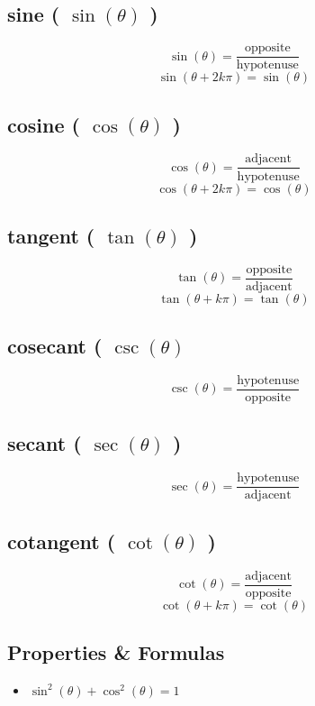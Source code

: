 \subsection{sine ( $\sin(\theta)$ )}\label{sin}

\[
    \sin(\theta) = \displaystyle \frac{\mathrm{opposite}}{\mathrm{hypotenuse}}
\]
\[    \sin(\theta + 2k\pi) = \sin(\theta)   \]

\subsection{cosine ( $\cos(\theta)$ )}\label{cos}

\[
    \cos(\theta) = \displaystyle\frac{\mathrm {adjacent} }{\mathrm {hypotenuse} }
\]
\[  \cos(\theta + 2k\pi ) = \cos(\theta)  \]

\subsection{tangent ( $\tan(\theta)$ )}\label{tan}

\[
    \tan(\theta) =\displaystyle \frac {\mathrm {opposite} }{\mathrm {adjacent} }
\]
\[  \tan(\theta + k\pi ) = \tan(\theta)  \]

\subsection{cosecant ( $\csc(\theta)$ }\label{csc}
\[
    \csc(\theta) =\displaystyle\frac {\mathrm {hypotenuse} }{\mathrm {opposite} }
\]

\subsection{secant ( $\sec(\theta)$ )}\label{sec}
\[
    \sec(\theta) =\displaystyle\frac {\mathrm {hypotenuse} }{\mathrm {adjacent} }
\]

\subsection{cotangent ( $\cot(\theta)$ )}\label{cot}

\[
    \cot(\theta) =\displaystyle\frac {\mathrm {adjacent} }{\mathrm {opposite} }
\]
\[  \cot(\theta + k\pi ) = \cot(\theta)  \]


\subsection{Properties \& Formulas}
\begin{itemize}
    \item \( \sin^2(\theta) + \cos^2(\theta) = 1 \)
\end{itemize}


